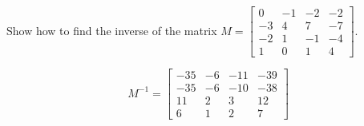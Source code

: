 
\begin{exerciseStatement}


Show how to find the inverse of the matrix \(M= \left[\begin{array}{cccc}
0 & -1 & -2 & -2 \\
-3 & 4 & 7 & -7 \\
-2 & 1 & -1 & -4 \\
1 & 0 & 1 & 4
\end{array}\right] \).


\end{exerciseStatement}
    
\begin{exerciseAnswer} 
\[M^{-1}= \left[\begin{array}{cccc}
-35 & -6 & -11 & -39 \\
-35 & -6 & -10 & -38 \\
11 & 2 & 3 & 12 \\
6 & 1 & 2 & 7
\end{array}\right] \]
\end{exerciseAnswer}
    
